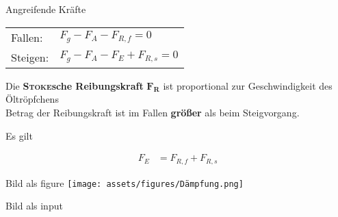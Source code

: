 \begin{frame}{Angreifende Kräfte}
    \begin{block}{}
        \begin{tabular}{ll}
            Fallen: & $F_g - F_A - F_{R,f} = 0$ \\
            Steigen: & $F_g - F_A - F_E + F_{R,s} = 0$
        \end{tabular}
    \end{block}

    Die \textbf{\textsc{Stoke}sche Reibungskraft} $\pmb{F_R}$ ist proportional zur Geschwindigkeit des Öltröpfchens \\
    \textrightarrow\space Betrag der Reibungskraft ist im Fallen \textbf{größer} als beim Steigvorgang.

    \vspace{1em}
    Es gilt
    \begin{block}{}
        \begin{align*} 
            F_E &= F_{R,f} + F_{R,s}
        \end{align*}
    \end{block}
\end{frame}

\begin{frame}{Bild als figure}
    \centering
    \texttt{[image: assets/figures/Dämpfung.png]}
\end{frame}

\begin{frame}{Bild als input}
    
\end{frame}